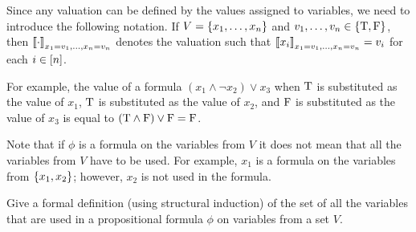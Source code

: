 Since any valuation can be defined by the values assigned to variables, we need
to introduce the following notation.
If $V = \set{x_1, \dots, x_n}$ and $v_1, \dots, v_n \in \set{\ltrue, \lfalse}$,
then $\left\llbracket {\cdot} \right\rrbracket_{x_1 = v_1, \dots, x_n = v_n}$ denotes the valuation
such that $\left\llbracket {x_i} \right\rrbracket_{x_1 = v_1, \dots, x_n = v_n} = v_i$ for each
$i \in {[{n}]}$.


For example, the value of a formula $(x_1 \land \lnot x_2) \lor x_3$ when
$\text{T}$ is substituted as the value of $x_1$, $\text{T}$ is substituted as the
value of $x_2$, and $\text{F}$ is substituted as the value of $x_3$ is equal to
$(\text{T} \land \text{F}) \lor \text{F} = \text{F}$.

Note that if $\phi$ is a formula on the variables from $V$ it does not mean that
all the variables from $V$ have to be used.
For example, $x_1$ is a formula on the variables from $\set{x_1, x_2}$; however,
$x_2$ is not used in the formula.

\begin{exercise}
  Give a formal definition (using structural induction) of the set of all the
  variables that are used in a propositional formula $\phi$ on variables from a
  set $V$.
\end{exercise}

